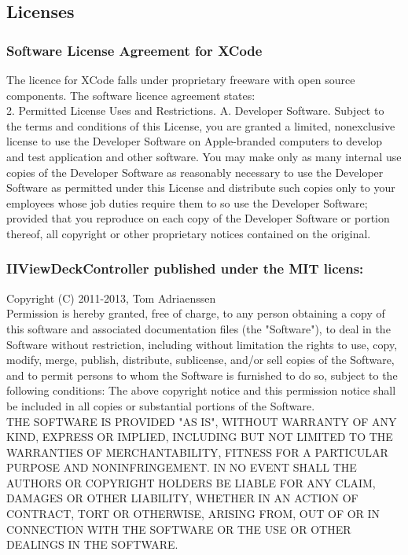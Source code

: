 \documentclass[a4wide, 10pt]{article}
\begin{document}
\subsection{Licenses}

\subsubsection{Software License Agreement for XCode}

The licence for XCode falls under proprietary freeware with open source components. The software licence agreement states:\\
2. Permitted License Uses and Restrictions.
A. Developer Software. Subject to the terms and conditions of this License, you are granted a limited, nonexclusive
license to use the Developer Software on Apple-branded computers to develop and test application
and other software. You may make only as many internal use copies of the Developer Software as
reasonably necessary to use the Developer Software as permitted under this License and distribute such
copies only to your employees whose job duties require them to so use the Developer Software; provided
that you reproduce on each copy of the Developer Software or portion thereof, all copyright or other
proprietary notices contained on the original.

\subsubsection{IIViewDeckController published under the MIT licens:}

Copyright (C) 2011-2013, Tom Adriaenssen\\
Permission is hereby granted, free of charge, to any person obtaining a copy of this software and associated documentation files (the "Software"), to deal in the Software without restriction, including without limitation the rights to use, copy, modify, merge, publish, distribute, sublicense, and/or sell copies of the Software, and to permit persons to whom the Software is furnished to do so, subject to the following conditions:
The above copyright notice and this permission notice shall be included in all copies or substantial portions of the Software.\\
THE SOFTWARE IS PROVIDED "AS IS", WITHOUT WARRANTY OF ANY KIND, EXPRESS OR IMPLIED, INCLUDING BUT NOT LIMITED TO THE WARRANTIES OF MERCHANTABILITY, FITNESS FOR A PARTICULAR PURPOSE AND NONINFRINGEMENT. IN NO EVENT SHALL THE AUTHORS OR COPYRIGHT HOLDERS BE LIABLE FOR ANY CLAIM, DAMAGES OR OTHER LIABILITY, WHETHER IN AN ACTION OF CONTRACT, TORT OR OTHERWISE, ARISING FROM, OUT OF OR IN CONNECTION WITH THE SOFTWARE OR THE USE OR OTHER DEALINGS IN THE SOFTWARE.
\end{document}
